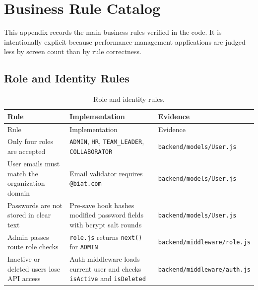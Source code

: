 \chapter{Business Rule Catalog}
This appendix records the main business rules verified in the code. It is intentionally explicit because performance-management applications are judged less by screen count than by rule correctness.

\section{Role and Identity Rules}
\begin{longtable}{p{}p{}p{}}
\caption{Role and identity rules.}\label{tab:role-rules}\\
\toprule
Rule & Implementation & Evidence\\
\midrule
\endfirsthead
\toprule
Rule & Implementation & Evidence\\
\midrule
\endhead
Only four roles are accepted & \texttt{ADMIN}, \texttt{HR}, \texttt{TEAM\_LEADER}, \texttt{COLLABORATOR} & \texttt{backend/models/User.js}\\
User emails must match the organization domain & Email validator requires \texttt{@biat.com} & \texttt{backend/models/User.js}\\
Passwords are not stored in clear text & Pre-save hook hashes modified password fields with bcrypt salt rounds & \texttt{backend/models/User.js}\\
Admin passes route role checks & \texttt{role.js} returns \texttt{next()} for \texttt{ADMIN} & \texttt{backend/middleware/role.js}\\
Inactive or deleted users lose API access & Auth middleware loads current user and checks \texttt{isActive} and \texttt{isDeleted} & \texttt{backend/middleware/auth.js}\\
\bottomrule
\end{longtable}

